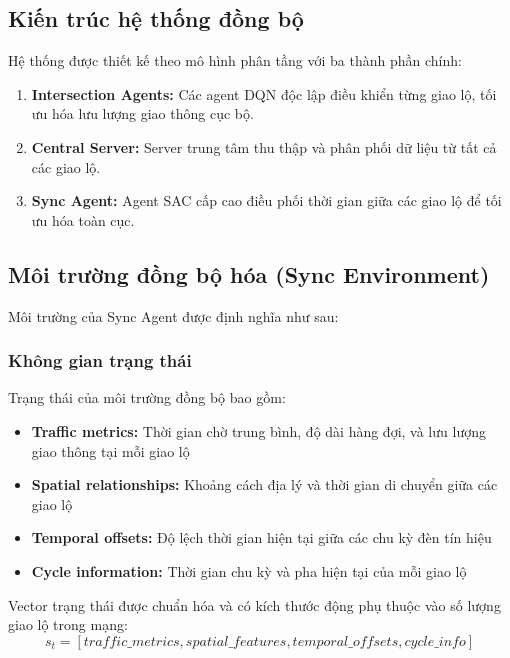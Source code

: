 \subsection{Kiến trúc hệ thống đồng bộ}
Hệ thống được thiết kế theo mô hình phân tầng với ba thành phần chính:

\begin{enumerate}
    \item \textbf{Intersection Agents:} Các agent DQN độc lập điều khiển từng
        giao lộ, tối ưu hóa lưu lượng giao thông cục bộ.

    \item \textbf{Central Server:} Server trung tâm thu thập và phân phối dữ
        liệu từ tất cả các giao lộ.

    \item \textbf{Sync Agent:} Agent SAC cấp cao điều phối thời gian giữa các
        giao lộ để tối ưu hóa toàn cục.
\end{enumerate}

\subsection{Môi trường đồng bộ hóa (Sync Environment)}
Môi trường của Sync Agent được định nghĩa như sau:

\subsubsection{Không gian trạng thái}
Trạng thái của môi trường đồng bộ bao gồm:
\begin{itemize}
    \item \textbf{Traffic metrics:} Thời gian chờ trung bình, độ dài hàng đợi,
        và lưu lượng giao thông tại mỗi giao lộ

    \item \textbf{Spatial relationships:} Khoảng cách địa lý và thời gian di
        chuyển giữa các giao lộ

    \item \textbf{Temporal offsets:} Độ lệch thời gian hiện tại giữa các chu kỳ
        đèn tín hiệu

    \item \textbf{Cycle information:} Thời gian chu kỳ và pha hiện tại của mỗi
        giao lộ
\end{itemize}

Vector trạng thái được chuẩn hóa và có kích thước động phụ thuộc vào số lượng giao lộ trong mạng:
\[
    s_{t} = [traffic\_metrics, spatial\_features, temporal\_offsets, cycle\_info]
\]

